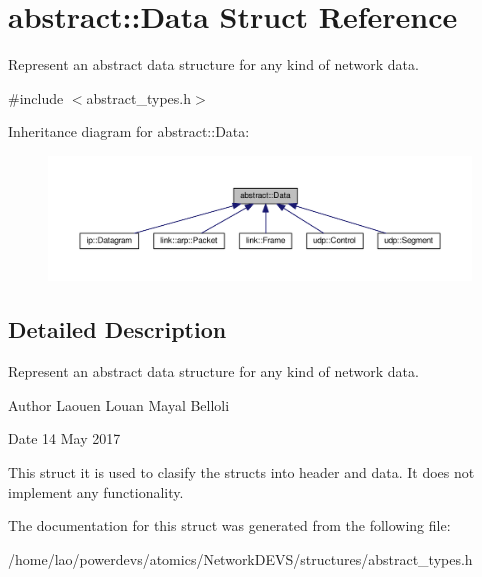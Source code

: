\hypertarget{structabstract_1_1Data}{}\section{abstract\+:\+:Data Struct Reference}
\label{structabstract_1_1Data}


Represent an abstract data structure for any kind of network data.  




{\ttfamily \#include $<$abstract\+\_\+types.\+h$>$}



Inheritance diagram for abstract\+:\+:Data\+:
\nopagebreak
\begin{figure}[H]
\begin{center}
\leavevmode
\includegraphics[width=350pt]{structabstract_1_1Data__inherit__graph}
\end{center}
\end{figure}


\subsection{Detailed Description}
Represent an abstract data structure for any kind of network data. 

\begin{DoxyAuthor}{Author}
Laouen Louan Mayal Belloli 
\end{DoxyAuthor}
\begin{DoxyDate}{Date}
14 May 2017
\end{DoxyDate}
This struct it is used to clasify the structs into header and data. It does not implement any functionality. 

The documentation for this struct was generated from the following file\+:\begin{DoxyCompactItemize}
\item 
/home/lao/powerdevs/atomics/\+Network\+D\+E\+V\+S/structures/abstract\+\_\+types.\+h\end{DoxyCompactItemize}

